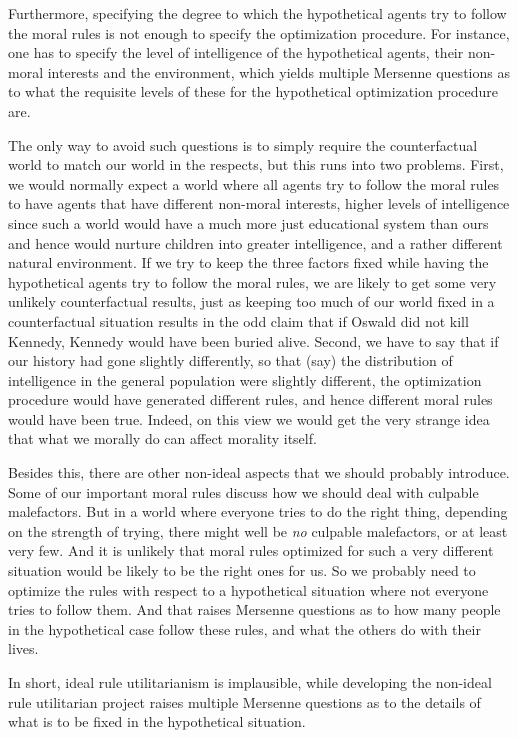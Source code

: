 Furthermore, specifying the degree to which the hypothetical agents try to follow the moral rules is not enough to specify the
optimization procedure. For instance, one has to specify the level of intelligence of the hypothetical agents, their non-moral 
interests and the environment, which yields multiple Mersenne questions as to what the requisite levels of these for the 
hypothetical optimization procedure are. 

The only way to avoid such questions is to  simply require the counterfactual world to match our
world in the respects, but this runs into two problems.
First, we would normally expect a world where all agents try to follow the moral rules to have agents that have different non-moral
interests, higher levels of intelligence since such a world would have a much more just educational system
than ours and hence would nurture children into greater intelligence, and a rather different natural environment. If we try
to keep the three factors fixed while having the hypothetical agents try to follow the moral rules, we are likely to get
some very unlikely counterfactual results, just as keeping too much of our world fixed in a counterfactual situation
results in the odd claim that if Oswald did not kill Kennedy, Kennedy would have been buried alive. 
Second, we have to say that if our history had gone slightly differently, so that (say) the distribution of intelligence in the
general population were slightly different, the optimization procedure would have generated different rules, and hence different
moral rules would have been true. Indeed, on this view we would get the very strange idea that what we morally do can affect morality
itself.

Besides this, there are other non-ideal aspects that we should probably introduce. Some of our important moral rules discuss how
we should deal with culpable malefactors. But in a world where everyone tries to do the right thing, depending on the strength
of trying, there might well be \textit{no} culpable malefactors, or at least very few. And it is unlikely that moral rules optimized
for such a very different situation would be likely to be the right ones for us. So we probably need to optimize the rules with
respect to a hypothetical situation where not everyone tries to follow them. And that raises Mersenne questions as to how many
people in the hypothetical case follow these rules, and what the others do with their lives. 

In short, ideal rule utilitarianism is implausible, while developing the non-ideal rule utilitarian project raises multiple
Mersenne questions as to the details of what is to be fixed in the hypothetical situation.

